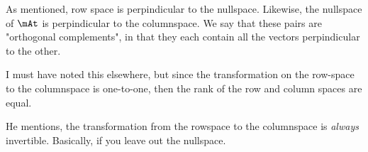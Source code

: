 As mentioned, row space is perpindicular to the nullspace. Likewise, the
nullspace of $\mAt$ is perpindicular to the columnspace. We say that
these pairs are "orthogonal complements", in that they each contain all
the vectors perpindicular to the other.

I must have noted this elsewhere, but since the transformation on the
row-space to the columnspace is one-to-one, then the rank of the row
and column spaces are equal.

He mentions, the transformation from the rowspace to the columnspace is
\emph{always} invertible. Basically, if you leave out the nullspace.
